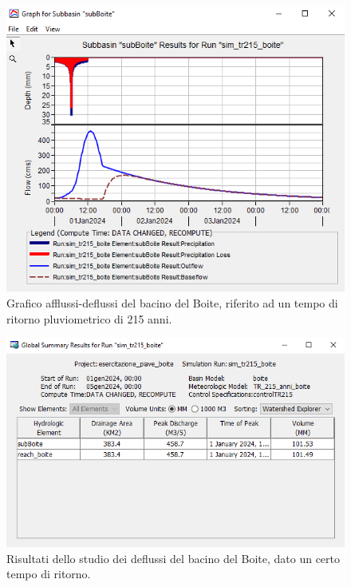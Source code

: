 \begin{figure}[H]\centering
    \includegraphics[scale=1]{immagini/boite_215.PNG}
    \caption{Grafico afflussi-deflussi del bacino del Boite, riferito ad un tempo di ritorno pluviometrico di 215 anni.}
        \label{boite_215}    
\end{figure}

\begin{figure}[H]\centering
    \includegraphics[scale=1]{immagini/risul_boite_215.PNG}
    \caption{Risultati dello studio dei deflussi del bacino del Boite, dato un certo tempo di ritorno.}
        \label{risul_boite_215}    
    \end{figure}

